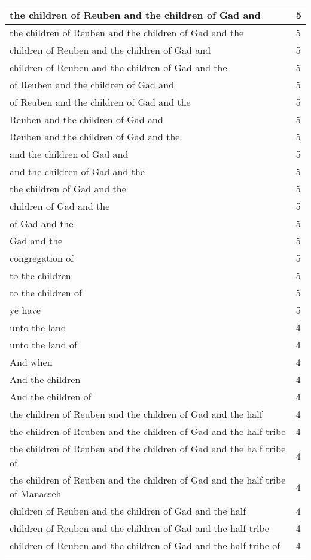 \begin{center}
\begin{longtable}{|p{3.0in}|p{0.5in}|}
the children of Reuben and the children of Gad and & 5\\ \hline 
the children of Reuben and the children of Gad and the & 5\\ \hline 
children of Reuben and the children of Gad and & 5\\ \hline 
children of Reuben and the children of Gad and the & 5\\ \hline 
of Reuben and the children of Gad and & 5\\ \hline 
of Reuben and the children of Gad and the & 5\\ \hline 
Reuben and the children of Gad and & 5\\ \hline 
Reuben and the children of Gad and the & 5\\ \hline 
and the children of Gad and & 5\\ \hline 
and the children of Gad and the & 5\\ \hline 
the children of Gad and the & 5\\ \hline 
children of Gad and the & 5\\ \hline 
of Gad and the & 5\\ \hline 
Gad and the & 5\\ \hline 
congregation of & 5\\ \hline 
to the children & 5\\ \hline 
to the children of & 5\\ \hline 
ye have & 5\\ \hline 
unto the land & 4\\ \hline 
unto the land of & 4\\ \hline 
And when & 4\\ \hline 
And the children & 4\\ \hline 
And the children of & 4\\ \hline 
the children of Reuben and the children of Gad and the half & 4\\ \hline 
the children of Reuben and the children of Gad and the half tribe & 4\\ \hline 
the children of Reuben and the children of Gad and the half tribe of & 4\\ \hline 
the children of Reuben and the children of Gad and the half tribe of Manasseh & 4\\ \hline 
children of Reuben and the children of Gad and the half & 4\\ \hline 
children of Reuben and the children of Gad and the half tribe & 4\\ \hline 
children of Reuben and the children of Gad and the half tribe of & 4\\ \hline 

\end{longtable}
\end{center}
